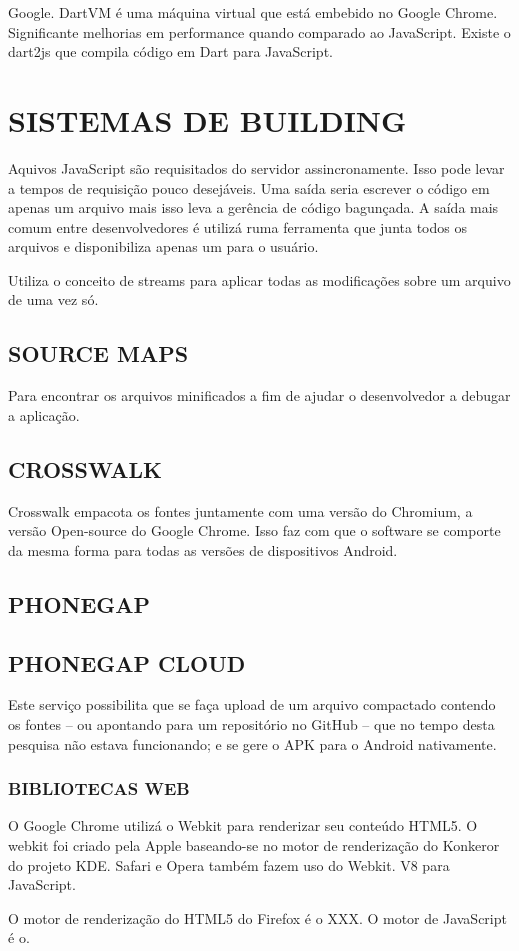 \documentclass[
12pt,
a4paper,
portuges,
draft
]{report}
\begin{document}
Google. DartVM é uma máquina virtual que está embebido no Google
Chrome. Significante melhorias em performance quando comparado
ao JavaScript. Existe o dart2js que compila código em Dart para
JavaScript.

\chapter{SISTEMAS DE BUILDING}

Aquivos JavaScript são requisitados do servidor assincronamente. Isso
pode levar a tempos de requisição pouco desejáveis. Uma saída seria
escrever o código em apenas um arquivo mais isso leva a gerência de
código bagunçada. A saída mais comum entre desenvolvedores é utilizá
ruma ferramenta que junta todos os arquivos e disponibiliza apenas um
para o usuário.

Utiliza o conceito de streams para aplicar todas as modificações sobre
um arquivo de uma vez só.

\section{SOURCE MAPS}

Para encontrar os arquivos minificados a fim de ajudar o desenvolvedor a
debugar a aplicação.


\section{CROSSWALK}
Crosswalk empacota os fontes juntamente com uma versão do Chromium, a
versão Open-source do Google Chrome. Isso faz com que o software se
comporte da mesma forma para todas as versões de dispositivos Android.

\section{PHONEGAP}
\section{PHONEGAP CLOUD}

Este serviço possibilita que se faça upload de um arquivo compactado
contendo os fontes – ou apontando para um repositório no GitHub –
que no tempo desta pesquisa não estava funcionando; e se gere o APK
para o Android nativamente.


\subsection{BIBLIOTECAS WEB}

O Google Chrome utilizá o Webkit para renderizar seu conteúdo HTML5. O
webkit foi criado pela Apple baseando-se no motor de renderização do
Konkeror do projeto KDE. Safari e Opera também fazem uso do Webkit. V8
para JavaScript.

O motor de renderização do HTML5 do Firefox é o XXX. O motor de
JavaScript é o.
\end{document}

